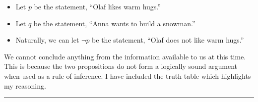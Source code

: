 \documentclass{article}
\begin{document}
\begin{enumerate}
          \begin{itemize}
              \item Let $p$ be the statement, ``Olaf likes warm hugs.''
              \item Let $q$ be the statement, ``Anna wants to build a snowman.''
              \item Naturally, we can let $\neg p$ be the statement, ``Olaf does not like warm
                    hugs.''
          \end{itemize}

          We cannot conclude anything from the information available to us at this time.
          This is because the two propositions do not form a logically sound argument
          when used as a rule of inference. I have included the truth table which
          highlights my reasoning.

          \begin{center}
          \end{center}

          \rule{\linewidth}{0.5pt}


\end{enumerate}
\end{document}

